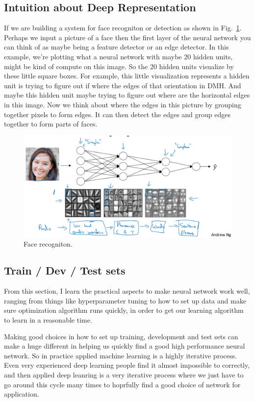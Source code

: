 \documentclass[a4paper]{article}
\begin{document}
\subsection{Intuition about Deep Representation}
If we are building a system for face recogniton or detection as shown in Fig.~\ref{p5}. Perhaps we input a picture of a face then the first layer of the neural network you can think of as maybe being a feature detector or an edge detector. In this example, we're plotting what a neural network with maybe 20 hidden units, might be kind of compute on this image. So the 20 hidden units visualize by these little square boxes. For example, this little visualization represents a hidden unit is trying to figure out if where the edges of that orientation in DMH. And maybe this hidden unit maybe trying to figure out where are the horizontal edges in this image.  Now we think about where the edges in this picture by grouping together pixels to form edges. It can then detect the edges and group edges together to form parts of faces.
\begin{figure}
	\begin{center}
		\includegraphics[scale=0.3]{figures/6.png}
	\end{center}
	\caption{Face recogniton.}
	\label{p5}
\end{figure}

\subsection{Train / Dev / Test sets}

From this section, I learn the practical aspects to make neural network work well, ranging from things like hyperparameter tuning to how to set up data and make sure optimization algorithm runs quickly, in order to get our learning algorithm to learn in a reasonable time.

Making good choices in how to set up training, development and test sets can make a huge different in helping us quickly find a good high performance neural network. So in practice applied machine learning is a highly iterative process. Even very experienced deep learning people find it almost impossible to correctly, and then applied deep leanring is a very iterative process where we just have to go around this cycle many times to hoprfully find a good choice of network for application. 
\end{document}

